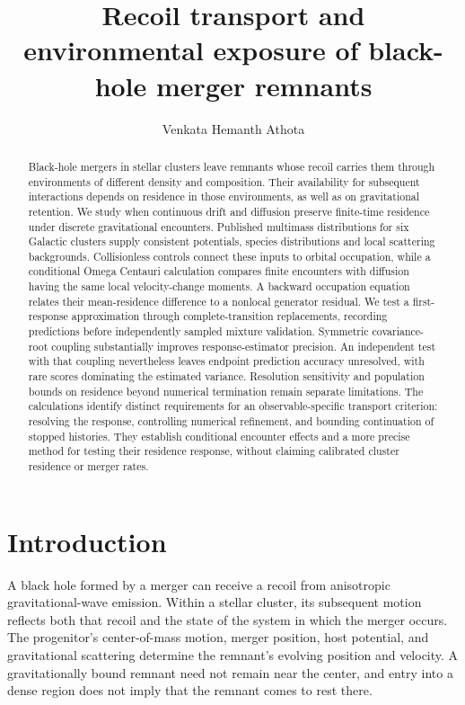 \documentclass[aps,prd,reprint,amsmath,amssymb,superscriptaddress,nofootinbib,longbibliography,floatfix]{revtex4-2}
\begin{document}
\raggedbottom
\title{Recoil transport and environmental exposure of black-hole merger remnants}
\author{Venkata Hemanth Athota}

\begin{abstract}
Black-hole mergers in stellar clusters leave remnants whose recoil carries them through environments of different density and composition. Their availability for subsequent interactions depends on residence in those environments, as well as on gravitational retention. We study when continuous drift and diffusion preserve finite-time residence under discrete gravitational encounters. Published multimass distributions for six Galactic clusters supply consistent potentials, species distributions and local scattering backgrounds. Collisionless controls connect these inputs to orbital occupation, while a conditional Omega Centauri calculation compares finite encounters with diffusion having the same local velocity-change moments. A backward occupation equation relates their mean-residence difference to a nonlocal generator residual. We test a first-response approximation through complete-transition replacements, recording predictions before independently sampled mixture validation. Symmetric covariance-root coupling substantially improves response-estimator precision. An independent test with that coupling nevertheless leaves endpoint prediction accuracy unresolved, with rare scores dominating the estimated variance. Resolution sensitivity and population bounds on residence beyond numerical termination remain separate limitations. The calculations identify distinct requirements for an observable-specific transport criterion: resolving the response, controlling numerical refinement, and bounding continuation of stopped histories. They establish conditional encounter effects and a more precise method for testing their residence response, without claiming calibrated cluster residence or merger rates.

\end{abstract}
\maketitle

\section{Introduction}\label{sec:introduction}

A black hole formed by a merger can receive a recoil from anisotropic gravitational-wave emission. Within a stellar cluster, its subsequent motion reflects both that recoil and the state of the system in which the merger occurs. The progenitor's center-of-mass motion, merger position, host potential, and gravitational scattering determine the remnant's evolving position and velocity. A gravitationally bound remnant need not remain near the center, and entry into a dense region does not imply that the remnant comes to rest there.
\end{document}
